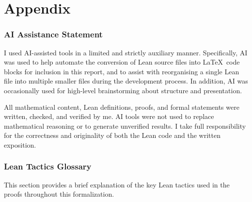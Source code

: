 \documentclass[
  12pt, %
]{assignment}
\begin{document}
\appendix
\part{Appendix}
\section{AI Assistance Statement}
I used AI-assisted tools in a limited and strictly auxiliary manner. Specifically, AI was used to help automate the conversion of Lean source files into \LaTeX\ code blocks for inclusion in this report, and to assist with reorganising a single Lean file into multiple smaller files during the development process. In addition, AI was occasionally used for high-level brainstorming about structure and presentation.

All mathematical content, Lean definitions, proofs, and formal statements were written, checked, and verified by me. AI tools were not used to replace mathematical reasoning or to generate unverified results. I take full responsibility for the correctness and originality of both the Lean code and the written exposition.



\section{Lean Tactics Glossary}
This section provides a brief explanation of the key Lean tactics used in the proofs throughout this formalization.
\end{document}
